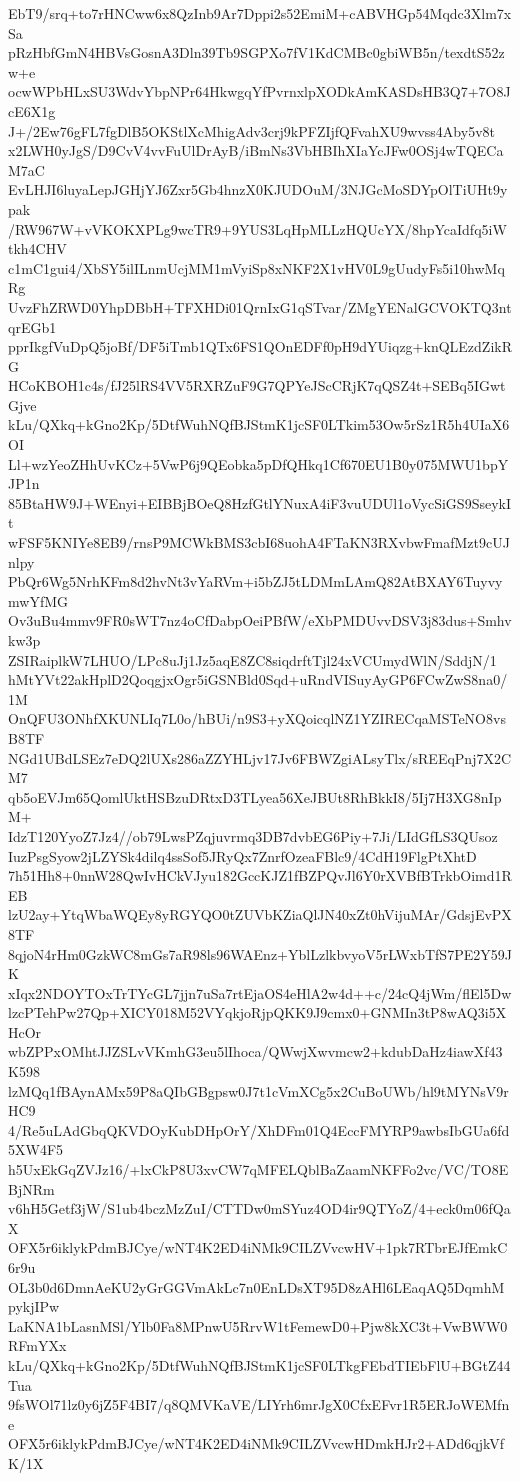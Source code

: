 EbT9/srq+to7rHNCww6x8QzInb9Ar7Dppi2s52EmiM+cABVHGp54Mqdc3Xlm7xSa
pRzHbfGmN4HBVsGosnA3Dln39Tb9SGPXo7fV1KdCMBc0gbiWB5n/texdtS52zw+e
ocwWPbHLxSU3WdvYbpNPr64HkwgqYfPvrnxlpXODkAmKASDsHB3Q7+7O8JcE6X1g
J+/2Ew76gFL7fgDlB5OKStlXcMhigAdv3crj9kPFZIjfQFvahXU9wvss4Aby5v8t
x2LWH0yJgS/D9CvV4vvFuUlDrAyB/iBmNs3VbHBIhXIaYcJFw0OSj4wTQECaM7aC
EvLHJI6luyaLepJGHjYJ6Zxr5Gb4hnzX0KJUDOuM/3NJGcMoSDYpOlTiUHt9ypak
/RW967W+vVKOKXPLg9wcTR9+9YUS3LqHpMLLzHQUcYX/8hpYcaIdfq5iWtkh4CHV
c1mC1gui4/XbSY5ilILnmUcjMM1mVyiSp8xNKF2X1vHV0L9gUudyFs5i10hwMqRg
UvzFhZRWD0YhpDBbH+TFXHDi01QrnIxG1qSTvar/ZMgYENalGCVOKTQ3ntqrEGb1
pprIkgfVuDpQ5joBf/DF5iTmb1QTx6FS1QOnEDFf0pH9dYUiqzg+knQLEzdZikRG
HCoKBOH1c4s/fJ25lRS4VV5RXRZuF9G7QPYeJScCRjK7qQSZ4t+SEBq5IGwtGjve
kLu/QXkq+kGno2Kp/5DtfWuhNQfBJStmK1jcSF0LTkim53Ow5rSz1R5h4UIaX6OI
Ll+wzYeoZHhUvKCz+5VwP6j9QEobka5pDfQHkq1Cf670EU1B0y075MWU1bpYJP1n
85BtaHW9J+WEnyi+EIBBjBOeQ8HzfGtlYNuxA4iF3vuUDUl1oVycSiGS9SseykIt
wFSF5KNIYe8EB9/rnsP9MCWkBMS3cbI68uohA4FTaKN3RXvbwFmafMzt9cUJnlpy
PbQr6Wg5NrhKFm8d2hvNt3vYaRVm+i5bZJ5tLDMmLAmQ82AtBXAY6TuyvymwYfMG
Ov3uBu4mmv9FR0sWT7nz4oCfDabpOeiPBfW/eXbPMDUvvDSV3j83dus+Smhvkw3p
ZSIRaiplkW7LHUO/LPc8uJj1Jz5aqE8ZC8siqdrftTjl24xVCUmydWlN/SddjN/1
hMtYVt22akHplD2QoqgjxOgr5iGSNBld0Sqd+uRndVISuyAyGP6FCwZwS8na0/1M
OnQFU3ONhfXKUNLIq7L0o/hBUi/n9S3+yXQoicqlNZ1YZIRECqaMSTeNO8vsB8TF
NGd1UBdLSEz7eDQ2lUXs286aZZYHLjv17Jv6FBWZgiALsyTlx/sREEqPnj7X2CM7
qb5oEVJm65QomlUktHSBzuDRtxD3TLyea56XeJBUt8RhBkkI8/5Ij7H3XG8nIpM+
IdzT120YyoZ7Jz4//ob79LwsPZqjuvrmq3DB7dvbEG6Piy+7Ji/LIdGfLS3QUsoz
IuzPsgSyow2jLZYSk4dilq4ssSof5JRyQx7ZnrfOzeaFBlc9/4CdH19FlgPtXhtD
7h51Hh8+0nnW28QwIvHCkVJyu182GccKJZ1fBZPQvJl6Y0rXVBfBTrkbOimd1REB
lzU2ay+YtqWbaWQEy8yRGYQO0tZUVbKZiaQlJN40xZt0hVijuMAr/GdsjEvPX8TF
8qjoN4rHm0GzkWC8mGs7aR98ls96WAEnz+YblLzlkbvyoV5rLWxbTfS7PE2Y59JK
xIqx2NDOYTOxTrTYcGL7jjn7uSa7rtEjaOS4eHlA2w4d++c/24cQ4jWm/flEl5Dw
lzcPTehPw27Qp+XICY018M52VYqkjoRjpQKK9J9cmx0+GNMIn3tP8wAQ3i5XHcOr
wbZPPxOMhtJJZSLvVKmhG3eu5lIhoca/QWwjXwvmcw2+kdubDaHz4iawXf43K598
lzMQq1fBAynAMx59P8aQIbGBgpsw0J7t1cVmXCg5x2CuBoUWb/hl9tMYNsV9rHC9
4/Re5uLAdGbqQKVDOyKubDHpOrY/XhDFm01Q4EccFMYRP9awbsIbGUa6fd5XW4F5
h5UxEkGqZVJz16/+lxCkP8U3xvCW7qMFELQblBaZaamNKFFo2vc/VC/TO8EBjNRm
v6hH5Getf3jW/S1ub4bczMzZuI/CTTDw0mSYuz4OD4ir9QTYoZ/4+eck0m06fQaX
OFX5r6iklykPdmBJCye/wNT4K2ED4iNMk9CILZVvcwHV+1pk7RTbrEJfEmkC6r9u
OL3b0d6DmnAeKU2yGrGGVmAkLc7n0EnLDsXT95D8zAHl6LEaqAQ5DqmhMpykjIPw
LaKNA1bLasnMSl/Ylb0Fa8MPnwU5RrvW1tFemewD0+Pjw8kXC3t+VwBWW0RFmYXx
kLu/QXkq+kGno2Kp/5DtfWuhNQfBJStmK1jcSF0LTkgFEbdTIEbFlU+BGtZ44Tua
9fsWOl71lz0y6jZ5F4BI7/q8QMVKaVE/LIYrh6mrJgX0CfxEFvr1R5ERJoWEMfne
OFX5r6iklykPdmBJCye/wNT4K2ED4iNMk9CILZVvcwHDmkHJr2+ADd6qjkVfK/1X
